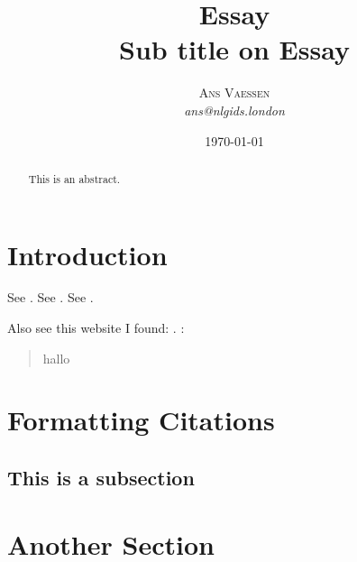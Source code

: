 \documentclass[a4paper, 11pt]{article}
\title{\textbf{Essay}\\Sub title on Essay}
\author{\textsc{Ans Vaessen}
\\{\textit{ans@nlgids.london}}}
\date{\today}
\begin{document}
 
\maketitle 

\begin{abstract}
This is an abstract.
\end{abstract}

\vspace{30pt} %

\section*{Introduction}

See \cite{Christensen97}.
See \citep{Christensen97}.
See \citep[p. 145]{Christensen97}.

Also see this website I found: \cite{TripAdvisor}.
:
\begin{quote}
hallo
\end{quote}

\section{Formatting Citations}

\subsection{This is a subsection}

\section{Another Section}

{}
\end{document}
